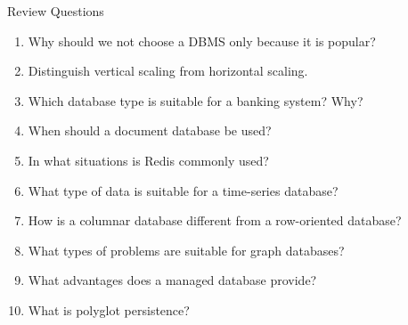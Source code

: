 \documentclass[aspectratio=169,11pt]{beamer}
\newcommand{\smallitem}{\setlength{\itemsep}{2pt}\setlength{\parskip}{0pt}}
\begin{document}
\begin{frame}[allowframebreaks]{Review Questions}
\small
\begin{enumerate}
  \smallitem
  \item Why should we not choose a DBMS only because it is popular?
  \item Distinguish vertical scaling from horizontal scaling.
  \item Which database type is suitable for a banking system? Why?
  \item When should a document database be used?
  \item In what situations is Redis commonly used?
  \item What type of data is suitable for a time-series database?
  \item How is a columnar database different from a row-oriented database?
  \item What types of problems are suitable for graph databases?
  \item What advantages does a managed database provide?
  \item What is polyglot persistence?
\end{enumerate}
\end{frame}
\end{document}
